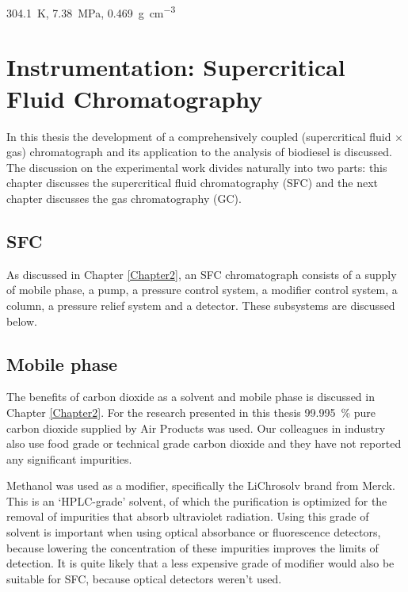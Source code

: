
\begin{savequote}[\quotewidth]
\SI{304.1}{\kelvin}, \SI{7.38}{\mega\pascal}, \SI{0.469}{\gram\per\cubic\centi\metre}
\end{savequote}

\chapter{Instrumentation: Supercritical Fluid Chromatography} %

\label{Chapter4} %

In this thesis the development of a comprehensively coupled (supercritical fluid
× gas) chromatograph and its application to the analysis of biodiesel is
discussed. The discussion on the experimental work divides naturally into two
parts: this chapter discusses the supercritical fluid chromatography (SFC) and
the next chapter discusses the gas chromatography (GC).

\section{SFC}

As discussed in Chapter \ref{Chapter2}, an SFC chromatograph consists of a
supply of mobile phase, a pump, a pressure control system, a modifier control
system, a column, a pressure relief system and a detector. These subsystems are
discussed below.

\section{Mobile phase}

The benefits of carbon dioxide as a solvent and mobile phase is discussed in
Chapter \ref{Chapter2}. For the research presented in this thesis
\SI{99.995}{\percent} pure carbon dioxide supplied by Air Products was used. Our
colleagues in industry also use food grade or technical grade carbon dioxide and
they have not reported any significant impurities.

Methanol was used as a modifier, specifically the LiChrosolv\textregistered{}
brand from Merck. This is an `HPLC-grade' solvent, of which the purification is
optimized for the removal of impurities that absorb ultraviolet radiation. Using
this grade of solvent is important when using optical absorbance or fluorescence
detectors, because lowering the concentration of these impurities improves the
limits of detection. It is quite likely that a less expensive grade of modifier
would also be suitable for SFC, because optical detectors weren't used.

